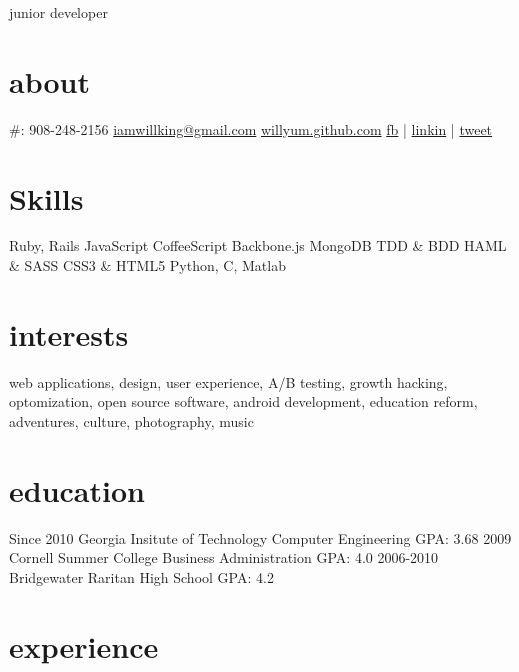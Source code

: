 \documentclass[]{cv}
\begin{document}
       {junior developer}

\begin{aside}
  \section{about}
     \#: 908-248-2156
    \href{mailto:iamwillking@gmail.com}{iamwillking@gmail.com}
    \href{http://willyum.github.com}{willyum.github.com}
    \href{http://facebook.com/iamwillking}{fb} | \href{http://www.linkedin.com/profile/view?id=158614185}{linkin} | \href{https://twitter.com/#!/iamwillking}{tweet}
  \section{Skills}
    Ruby, Rails
    JavaScript
    CoffeeScript
    Backbone.js
    MongoDB
    TDD \& BDD
    HAML \& SASS
    CSS3 \& HTML5
    Python, C, Matlab
\end{aside}

\section{interests}

web applications, design, user experience, A/B testing, growth hacking, optomization, open source software, android development, education reform, adventures, culture, photography, music

\section{education}

\begin{entrylist}
  \entry
    {Since 2010}
    {Georgia Insitute of Technology}
    {Computer Engineering}
    {GPA: 3.68\newline}
  \entry
    {2009}
    {Cornell Summer College}
    {Business Administration}
    {GPA: 4.0\newline}
  \entry
    {2006-2010}
    {Bridgewater Raritan High School}
    {}
    {GPA: 4.2\newline}
\end{entrylist}

\section{experience}
\end{document}
